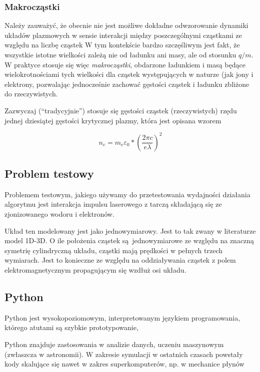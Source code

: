 \subsubsection{Makrocząstki}
Należy zauważyć, że obecnie nie jest możliwe dokładne odwzorowanie dynamiki układów plazmowych w sensie interakcji
między poszczególnymi cząstkami ze względu na liczbę cząstek %
W tym kontekście bardzo szczęśliwym jest fakt, że wszystkie istotne wielkości zależą nie od ładunku ani masy,
ale od stosunku $q/m$. W praktyce stosuje się więc \emph{makrocząstki}, obdarzone ładunkiem i masą będące wielokrotnościami
tych wielkości dla cząstek występujących w naturze (jak jony i elektrony, pozwalając jednocześnie zachować gęstości
cząstek i ładunku %
zbliżone do rzeczywistych.

Zazwyczaj (``tradycyjnie'') stosuje się gęstości cząstek (rzeczywistych) rzędu jednej dziesiątej gęstości krytycznej plazmy,
która jest opisana wzorem

\begin{equation}
    n_c = m_e \varepsilon_0 * (\frac{2 \pi c}{e \lambda})^2
    \label{eqn:critical-density}
\end{equation}

\subsection{Problem testowy}

Problemem testowym, jakiego używamy do przetestowania wydajności działania algorytmu jest
interakcja impulsu laserowego z tarczą składającą się ze zjonizowanego wodoru i elektronów.

Układ ten modelowany jest jako jednowymiarowy. Jest to tak zwany w literaturze model 1D-3D. O ile położenia cząstek
są jednowymiarowe ze względu na znaczną symetrię
cylindryczną układu, cząstki mają prędkości w pełnych trzech wymiarach. Jest to konieczne ze względu
na oddziaływania cząstek z polem elektromagnetycznym propagującym się wzdłuż osi układu.

\subsection{Python}
Python jest wysokopoziomowym, interpretowanym językiem programowania, którego atutami są szybkie prototypowanie,

Python znajduje zastosowania w analizie danych, uczeniu maszynowym (zwłaszcza w astronomii). W zakresie symulacji
w ostatnich czasach powstały kody skalujące się nawet w zakres superkomputerów, np. w mechanice płynów %


